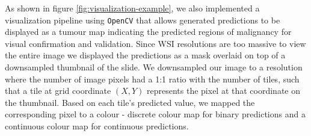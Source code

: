 \documentclass{l4proj}
\begin{document}
As shown in figure \ref{fig:visualization-example}, we also implemented a visualization pipeline using \texttt{OpenCV} that allows generated predictions to be displayed as a tumour map indicating the predicted regions of malignancy for visual confirmation and validation. Since WSI resolutions are too massive to view the entire image we displayed the predictions as a mask overlaid on top of a downsampled thumbnail of the slide. We downsampled our image to a resolution where the number of image pixels had a 1:1 ratio with the number of tiles, such that a tile at grid coordinate \((X, Y)\) represents the pixel at that coordinate on the thumbnail. Based on each tile's predicted value, we mapped the corresponding pixel to a colour - discrete colour map for binary predictions and a continuous colour map for continuous predictions. 
\end{document}
